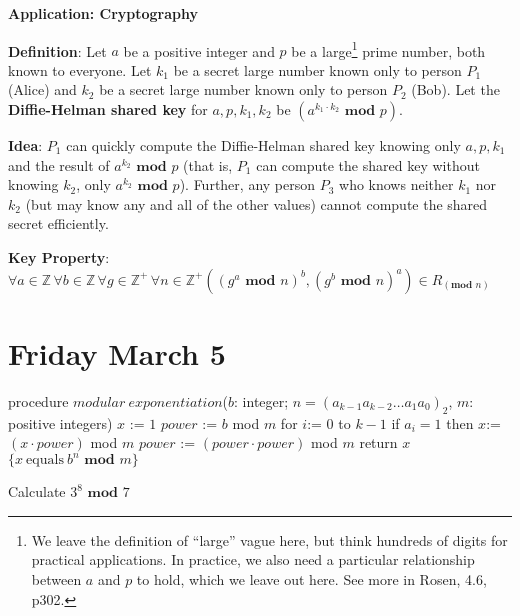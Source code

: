 \documentclass[12pt, oneside]{article}
\begin{document}
\newpage
{\bf Application: Cryptography}

{\bf Definition}: Let $a$ be a positive integer and $p$ be a large\footnote{We leave the definition of ``large'' vague here, but think hundreds of digits for practical applications. In practice, we also need a particular relationship between $a$ and $p$ to hold, which we leave out here. See more in Rosen, 4.6, p302.} prime number, both known to everyone. Let $k_1$ be a secret large number known only to person $P_1$ (Alice) and $k_2$ be a secret large number known only to person $P_2$ (Bob). Let the {\bf Diffie-Helman shared key} for $a, p, k_1, k_2$ be $(a^{k_1\cdot k_2} \textbf{ mod } p)$.

{\bf Idea}: $P_1$ can quickly compute the Diffie-Helman shared key knowing only $a, p, k_1$ and the result of $a^{k_2} \textbf{ mod } p$ (that is, $P_1$ can compute the shared key without knowing $k_2$, only $a^{k_2} \textbf{ mod } p$). Further, any person $P_3$ who knows neither $k_1$ nor $k_2$ (but may know any and all of the other values) cannot compute the shared secret efficiently.

{\bf Key Property}: $\forall a \in \mathbb{Z} \, \forall b \in \mathbb{Z} \, \forall g \in \mathbb{Z}^+ \, \forall n \in \mathbb{Z}^+ ((g^a \textbf{ mod } n)^b, (g^b \textbf{ mod } n)^a) \in R_{(\textbf{mod } n)}$

\newpage
\section*{Friday March 5}




\begin{minipage}{4.5in}
\begin{algorithm}[caption={Modular Exponentation; Algorithm 5 in Section 4.2 (page 254)}]
procedure $modular~exponentiation$($b$: integer; 
             $n = (a_{k-1}a_{k-2} \ldots a_1 a_0)_2$, $m$: positive integers)
$x$ := $1$
$power$ := $b$ mod $m$
for $i$:= $0$ to $k-1$
  if $a_i = 1$ then $x$:= $(x \cdot power)$ mod $m$
  $power$ := $(power \cdot power)$ mod $m$
return $x$ $\{x~\textrm{equals}~b^n \textbf{ mod } m\} $
\end{algorithm}
\end{minipage}

Calculate $3^8 \textbf{ mod } 7$
\end{document}
